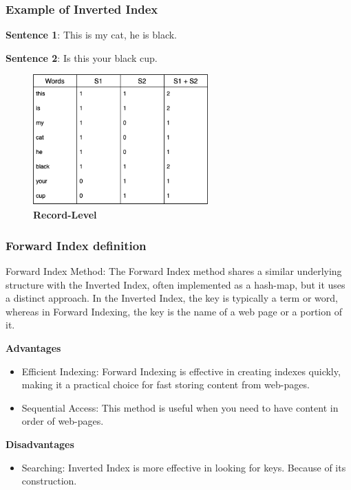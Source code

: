 \documentclass[10pt,a4paper]{article}
\begin{document}
\subsubsection{Example of Inverted Index}
\begin{minipage}{0.7\textwidth}
  \textbf{Sentence 1}: This is my cat, he is black.

  \textbf{Sentence 2}: Is this your black cup.
\end{minipage}

\begin{figure}[h]
  \centering
  \captionsetup{labelformat=empty}
  \includegraphics[width=0.6\textwidth]{example.png}  %
  \caption{\textbf{Record-Level}}
\end{figure}

\subsubsection{Forward Index definition}

Forward Index Method: The Forward Index method shares a similar underlying structure with the Inverted Index, often implemented as a hash-map, but it uses a distinct approach. In the Inverted Index, the key is typically a term or word, whereas in Forward Indexing, the key is the name of a web page or a portion of it.


\textbf{Advantages}
\begin{itemize}
  \item Efficient Indexing: Forward Indexing is effective in creating indexes quickly, making it a practical choice for fast storing content from web-pages.
  \item Sequential Access: This method is useful when you need to have content in order of web-pages.
\end{itemize}

\textbf{Disadvantages}
\begin{itemize}
  \item Searching: Inverted Index is more effective in looking for keys. Because of its construction.
\end{itemize}
\end{document}
